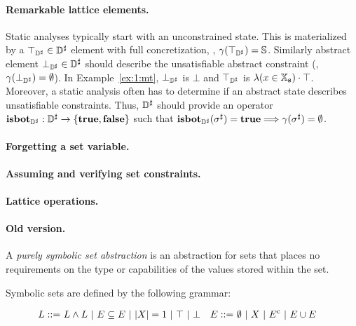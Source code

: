\paragraph{Remarkable lattice elements.}
Static analyses typically start with an unconstrained state.
This is materialized by a \( \top_{{\mathbb{D}}^{\sharp}} \in {\mathbb{D}}^{\sharp} \) element with full
concretization, \ie, \( \gamma( \top_{{\mathbb{D}}^{\sharp}} ) = \mathbb{S} \).
Similarly abstract element \( \bot_{{\mathbb{D}}^{\sharp}} \in {\mathbb{D}}^{\sharp} \) should describe
the unsatisfiable abstract constraint (\ie, \( \gamma( \bot_{{\mathbb{D}}^{\sharp}} ) =
\emptyset \)).
In Example~\ref{ex:1:mt}, \( \bot_{{\mathbb{D}}^{\sharp}} \) is \( \bot \) and \( \top_{{\mathbb{D}}^{\sharp}} \)
is \( \lambda (x \in \mathbb{X}_{\bf s}) \cdot \top \).
Moreover, a static analysis often has to determine if an abstract state
describes unsatisfiable constraints.
Thus, \( {\mathbb{D}}^{\sharp} \) should provide an operator \( \textbf{isbot}_{{\mathbb{D}}^{\sharp}}: {\mathbb{D}}^{\sharp}
\rightarrow \{ \mathbf{true}, \mathbf{false} \} \) such that \( \textbf{isbot}_{{\mathbb{D}}^{\sharp}}( {\sigma}^{\sharp} )
= \mathbf{true} \Longrightarrow \gamma( {\sigma}^{\sharp} ) = \emptyset \).

\paragraph{Forgetting a set variable.}

\paragraph{Assuming and verifying set constraints.}

\paragraph{Lattice operations.}

\paragraph{Old version.}

  A \emph{purely symbolic set abstraction} is an abstraction for sets that places no requirements on the type or capabilities of the values stored within the set.

\begin{definition}
    Symbolic sets are defined by the following grammar:
    
    \begin{align*}
        L ::= & \ L \wedge L \ | \ E \subseteq E \ | \ |{X}| = 1 \ | \ \top \ | \ \bot &
        E ::= & \ \emptyset \ | \ X \ | \ {E}^{\mathrm{c}} \ | \ E \cup E
    \end{align*}
\end{definition}

